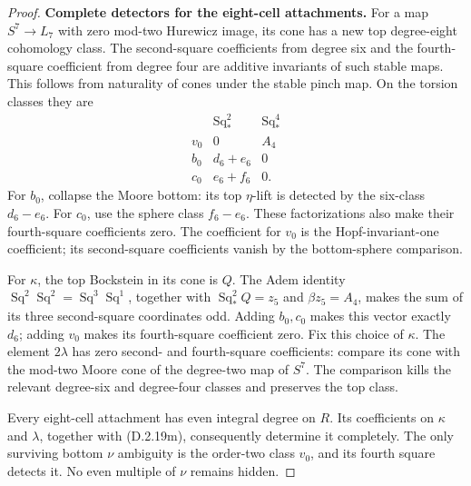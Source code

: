 \begin{proof}
\medskip\noindent
\textbf{Complete detectors for the eight-cell attachments.}
For a map $S^7\to L_7$ with zero mod-two Hurewicz image,
its cone has a new top degree-eight cohomology class.
The second-square coefficients from degree six and the
fourth-square coefficient from degree four are additive
invariants of such stable maps. This follows from
naturality of cones under the stable pinch map.
On the torsion classes they are
\[
\begin{array}{c|c|c}
 &\operatorname{Sq}_*^2&\operatorname{Sq}_*^4\\\hline
 v_0&0&A_4\\
 b_0&d_6+e_6&0\\
 c_0&e_6+f_6&0.
\end{array}
 \tag{D.2.19m}
\]
For $b_0$, collapse the Moore bottom: its top
$\eta$-lift is detected by the six-class $d_6-e_6$.
For $c_0$, use the sphere class $f_6-e_6$. These
factorizations also make their fourth-square coefficients
zero. The coefficient for $v_0$ is the Hopf-invariant-one
coefficient; its second-square coefficients vanish by
the bottom-sphere comparison.

For $\kappa$, the top Bockstein in its cone is $Q$.
The Adem identity
$\operatorname{Sq}^2\operatorname{Sq}^2
=\operatorname{Sq}^3\operatorname{Sq}^1$, together with
$\operatorname{Sq}_*^2Q=z_5$ and $\beta z_5=A_4$,
makes the sum of its three second-square coordinates odd.
Adding $b_0,c_0$ makes this vector exactly $d_6$;
adding $v_0$ makes its fourth-square coefficient zero.
Fix this choice of $\kappa$.
The element $2\lambda$ has zero second- and
fourth-square coefficients: compare its cone with the
mod-two Moore cone of the degree-two map of $S^7$.
The comparison kills the relevant degree-six and
degree-four classes and preserves the top class.

Every eight-cell attachment has even integral degree
on $R$. Its coefficients on $\kappa$ and $\lambda$,
together with \textup{(D.2.19m)}, consequently determine
it completely. The only surviving bottom $\nu$ ambiguity
is the order-two class $v_0$, and its fourth square
detects it. No even multiple of $\nu$ remains hidden.


\end{proof}
